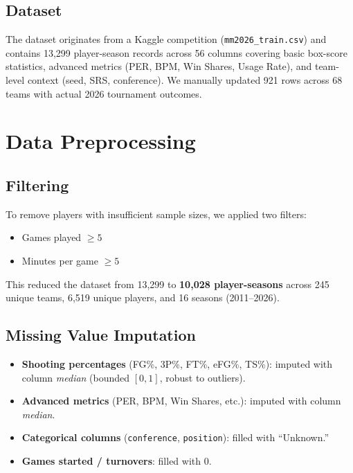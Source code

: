 \documentclass[12pt, a4paper]{article}
\begin{document}
\subsection{Dataset}

The dataset originates from a Kaggle competition (\texttt{mm2026\_train.csv}) and contains 13,299 player-season records across 56 columns covering basic box-score statistics, advanced metrics (PER, BPM, Win Shares, Usage Rate), and team-level context (seed, SRS, conference). We manually updated 921 rows across 68 teams with actual 2026 tournament outcomes.

\section{Data Preprocessing}
\label{sec:preprocessing}

\subsection{Filtering}

To remove players with insufficient sample sizes, we applied two filters:
\begin{itemize}
    \item Games played $\geq 5$
    \item Minutes per game $\geq 5$
\end{itemize}
This reduced the dataset from 13,299 to \textbf{10,028 player-seasons} across 245 unique teams, 6,519 unique players, and 16 seasons (2011--2026).

\subsection{Missing Value Imputation}

\begin{itemize}
    \item \textbf{Shooting percentages} (FG\%, 3P\%, FT\%, eFG\%, TS\%): imputed with column \textit{median} (bounded $[0,1]$, robust to outliers).
    \item \textbf{Advanced metrics} (PER, BPM, Win Shares, etc.): imputed with column \textit{median}.
    \item \textbf{Categorical columns} (\texttt{conference}, \texttt{position}): filled with ``Unknown.''
    \item \textbf{Games started / turnovers}: filled with 0.
\end{itemize}
\end{document}
